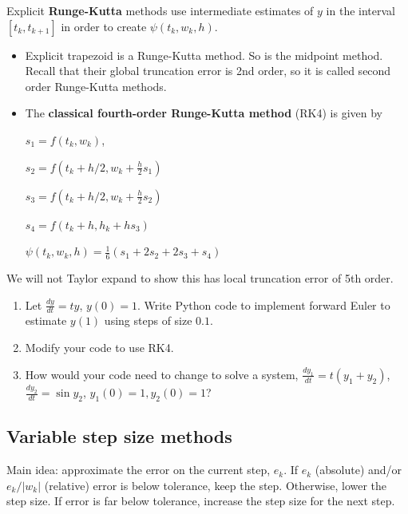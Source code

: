 \documentclass[12pt,letterpaper,noanswers]{exam}
\begin{document}
\begin{tcolorbox}
Explicit \textbf{Runge-Kutta} methods use intermediate estimates of $y$ in the interval $[t_k,t_{k+1}]$ in order to create $\psi(t_k,w_k,h)$.  
\begin{itemize}
\itemsep0pt
    \item Explicit trapezoid is a Runge-Kutta method.  So is the midpoint method.  Recall that their global truncation error is 2nd order, so it is called second order Runge-Kutta methods.
    \item The \textbf{classical fourth-order Runge-Kutta method} (RK4) is given by 
    
    $s_1 = f(t_k,w_k)$, 
    
    $s_2 = f(t_k+h/2,w_k+\frac{h}{2}s_1)$
    
    $s_3 = f(t_k + h/2,w_k + \frac{h}{2}s_2)$
    
    $s_4 = f(t_k+h, h_k + hs_3)$
    
    $\psi(t_k,w_k,h) = \frac{1}{6}(s_1+2s_2+2s_3+s_4)$
\end{itemize}

We will not Taylor expand to show this has local truncation error of 5th order.
\end{tcolorbox}
\begin{enumerate}[resume]
\item Let $\frac{dy}{dt} = ty$, $y(0) = 1$.  Write Python code to implement forward Euler to estimate $y(1)$ using steps of size $0.1$.
\vspace{1in}

\item Modify your code to use RK4.
\vspace{1in}

\item How would your code need to change to solve a system, $\frac{dy_1}{dt} = t(y_1+y_2)$, $\frac{dy_2}{dt} = \sin y_2$, $y_1(0) = 1, y_2(0) = 1$?
\end{enumerate}

\subsection*{Variable step size methods}

Main idea: approximate the error on the current step, $e_k$.  If $e_k$ (absolute) and/or $e_k/\vert w_k\vert$ (relative) error is below tolerance, keep the step.  Otherwise, lower the step size.  If error is far below tolerance, increase the step size for the next step.
\end{document}
